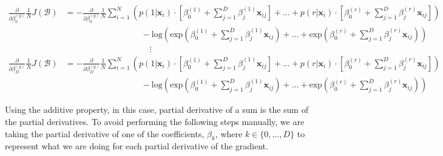 \documentclass{article}
\begin{document}
\begin{equation*}
    \begin{split}
        \frac{\partial}{\partial \beta_{0}^{(g)}} \frac{1}{N} J(\mathcal{B}) & = - \frac{\partial}{\partial \beta_{0}^{(g)}} \frac{1}{N} \sum_{i = 1}^{N} \left ( p(1 | \boldsymbol x_{i}) \cdot \left [ \beta_{0}^{(1)} + \sum_{j = 1}^{D} \beta_{j}^{(1)} \boldsymbol x_{ij} \right ] + \ldots + p(r | \boldsymbol x_{i}) \cdot \left [ \beta_{0}^{(r)} + \sum_{j = 1}^{D} \beta_{j}^{(r)} \boldsymbol x_{ij} \right ] \right ) \\
        & \quad \quad \quad \quad \quad \quad \quad \quad \quad - \text{log} {\left ( \text{exp}\left ( \beta_{0}^{(1)} + \sum_{j = 1}^{D} \beta_{j}^{(1)} \boldsymbol x_{ij} \right ) + \ldots + \text{exp}\left ( \beta_{0}^{(r)} + \sum_{j = 1}^{D} \beta_{j}^{(r)} \boldsymbol x_{ij} \right ) \right )} \\
        & \quad \quad \quad \quad \quad \quad \quad \quad \quad \quad \vdots \\
        \frac{\partial}{\partial \beta_{D}^{(g)}} \frac{1}{N} J(\mathcal{B}) & = - \frac{\partial}{\partial \beta_{D}^{(g)}} \frac{1}{N} \sum_{i = 1}^{N} \left ( p(1 | \boldsymbol x_{i}) \cdot \left [ \beta_{0}^{(1)} + \sum_{j = 1}^{D} \beta_{j}^{(1)} \boldsymbol x_{ij} \right ] + \ldots + p(r | \boldsymbol x_{i}) \cdot \left [ \beta_{0}^{(r)} + \sum_{j = 1}^{D} \beta_{j}^{(r)} \boldsymbol x_{ij} \right ] \right ) \\
        & \quad \quad \quad \quad \quad \quad \quad \quad \quad - \text{log} {\left ( \text{exp}\left ( \beta_{0}^{(1)} + \sum_{j = 1}^{D} \beta_{j}^{(1)} \boldsymbol x_{ij} \right ) + \ldots + \text{exp}\left ( \beta_{0}^{(r)} + \sum_{j = 1}^{D} \beta_{j}^{(r)} \boldsymbol x_{ij} \right ) \right )}
    \end{split}
\end{equation*}

Using the additive property, in this case, partial derivative of a sum is the sum of the partial derivatives. To avoid performing the following steps manually, we are taking the partial derivative of one of the coefficients, $\beta_{k}$, where $k \in \{0, \ldots, D\}$ to represent what we are doing for each partial derivative of the gradient.
\end{document}
